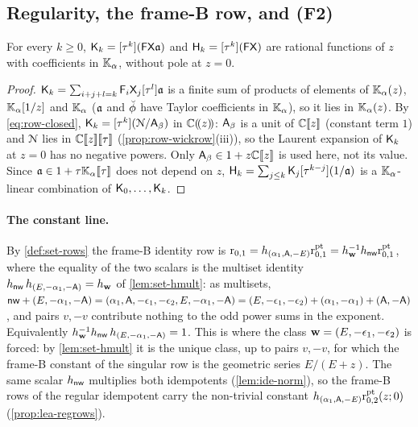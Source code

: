 \subsection{Regularity, the frame-B row, and (F2)}
\label{sec:row-main}

\begin{cor}
\label{cor:row-reg}
For every $k\geq0$, $\mathsf{K}_k=[\tau^k](\mathsf{F}\mathsf{X}\mathfrak{a})$ and $\mathsf{H}_k=[\tau^k](\mathsf{F}\mathsf{X})$ are rational functions of $z$ with coefficients in $\mathbb{K}_{\alpha}$, without pole at $z=0$.
\end{cor}

\begin{proof}
$\mathsf{K}_k=\sum_{i+j+l=k}\mathsf{F}_i\mathsf{X}_j[\tau^l]\mathfrak{a}$ is a finite sum of products of elements of $\mathbb{K}_{\alpha}(z)$, $\mathbb{K}_{\alpha}[1/z]$ and $\mathbb{K}_{\alpha}$ ($\mathfrak{a}$ and $\breve{\phi}$ have Taylor coefficients in $\mathbb{K}_{\alpha}$), so it lies in $\mathbb{K}_{\alpha}(z)$. By \eqref{eq:row-closed}, $\mathsf{K}_k=[\tau^k](\mathcal{N}/\mathsf{A}_{\beta})$ in $\mathbb{C}(\!(z)\!)$: $\mathsf{A}_{\beta}$ is a unit of $\mathbb{C}[\![ z ]\!]$ (constant term $1$) and $\mathcal{N}$ lies in $\mathbb{C}[\![ z ]\!][\![ \tau ]\!]$ (\cref{prop:row-wickrow}(iii)), so the Laurent expansion of $\mathsf{K}_k$ at $z=0$ has no negative powers. Only $\mathsf{A}_{\beta}\in1+z\mathbb{C}[\![ z ]\!]$ is used here, not its value. Since $\mathfrak{a}\in1+\tau\mathbb{K}_{\alpha}[\![ \tau ]\!]$ does not depend on $z$, $\mathsf{H}_k=\sum_{j\leq k}\mathsf{K}_j[\tau^{k-j}](1/\mathfrak{a})$ is a $\mathbb{K}_{\alpha}$-linear combination of $\mathsf{K}_0,\dots,\mathsf{K}_k$.
\end{proof}

\paragraph{The constant line.} By \cref{def:set-rows} the frame-B identity row is $\mathrm{r}_{0,1}=h_{(\alpha_1,\mathsf{A},-E)}\mathrm{r}^{\mathrm{pt}}_{0,1}=h_{\mathbf{w}}^{-1}h_{\mathsf{nw}}\mathrm{r}^{\mathrm{pt}}_{0,1}$, where the equality of the two scalars is the multiset identity $h_{\mathsf{nw}}\,h_{(E,-\alpha_1,-\mathsf{A})}=h_{\mathbf{w}}$ of \cref{lem:set-hmult}: as multisets, $\mathsf{nw}+(E,-\alpha_1,-\mathsf{A})=(\alpha_1,\mathsf{A},-\epsilon_1,-\epsilon_2,E,-\alpha_1,-\mathsf{A})=(E,-\epsilon_1,-\epsilon_2)+(\alpha_1,-\alpha_1)+(\mathsf{A},-\mathsf{A})$, and pairs $v,-v$ contribute nothing to the odd power sums in the exponent. Equivalently $h_{\mathbf{w}}^{-1}h_{\mathsf{nw}}\,h_{(E,-\alpha_1,-\mathsf{A})}=1$. This is where the class $\mathbf{w}=(E,-\epsilon_1,-\epsilon_2)$ is forced: by \cref{lem:set-hmult} it is the unique class, up to pairs $v,-v$, for which the frame-B constant of the singular row is the geometric series $E/(E+z)$. The same scalar $h_{\mathsf{nw}}$ multiplies both idempotents (\cref{lem:ide-norm}), so the frame-B rows of the regular idempotent carry the non-trivial constant $h_{(\alpha_1,\mathsf{A},-E)}\mathrm{r}^{\mathrm{pt}}_{0,2}(z;0)$ (\cref{prop:lea-regrows}).

